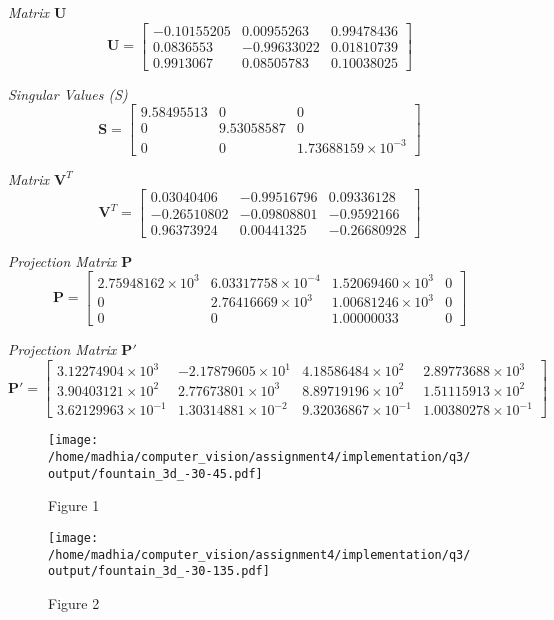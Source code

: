 \documentclass{article}
\begin{document}
\textit{Matrix $\mathbf{U}$}
\[
\mathbf{U} = \begin{bmatrix}
-0.10155205 & 0.00955263 & 0.99478436 \\ 
0.0836553 & -0.99633022 & 0.01810739 \\ 
0.9913067 & 0.08505783 & 0.10038025 
\end{bmatrix}
\]

\textit{Singular Values (S)}
\[
\mathbf{S} = \begin{bmatrix}
9.58495513 & 0 & 0 \\ 
0 & 9.53058587 & 0 \\ 
0 & 0 & 1.73688159 \times 10^{-3} 
\end{bmatrix}
\]

\textit{Matrix $\mathbf{V}^T$}
\[
\mathbf{V}^T = \begin{bmatrix}
0.03040406 & -0.99516796 & 0.09336128 \\ 
-0.26510802 & -0.09808801 & -0.9592166 \\ 
0.96373924 & 0.00441325 & -0.26680928 
\end{bmatrix}
\]

\textit{Projection Matrix $\mathbf{P}$}
\[
\mathbf{P} = \begin{bmatrix}
2.75948162 \times 10^{3} & 6.03317758 \times 10^{-4} & 1.52069460 \times 10^{3} & 0 \\ 
0 & 2.76416669 \times 10^{3} & 1.00681246 \times 10^{3} & 0 \\ 
0 & 0 & 1.00000033 & 0 
\end{bmatrix}
\]

\textit{Projection Matrix $\mathbf{P}'$}
\[
\mathbf{P}' = \begin{bmatrix}
3.12274904 \times 10^{3} & -2.17879605 \times 10^{1} & 4.18586484 \times 10^{2} & 2.89773688 \times 10^{3} \\ 
3.90403121 \times 10^{2} & 2.77673801 \times 10^{3} & 8.89719196 \times 10^{2} & 1.51115913 \times 10^{2} \\ 
3.62129963 \times 10^{-1} & 1.30314881 \times 10^{-2} & 9.32036867 \times 10^{-1} & 1.00380278 \times 10^{-1} 
\end{bmatrix}
\]

\begin{figure}[h!]
    \centering
    \begin{minipage}{0.4\textwidth}
        \centering
        \texttt{[image: /home/madhia/computer\_vision/assignment4/implementation/q3/output/fountain\_3d\_-30-45.pdf]}
        \caption{Figure 1}
    \end{minipage}%
    \begin{minipage}{0.4\textwidth}
        \centering
        \texttt{[image: /home/madhia/computer\_vision/assignment4/implementation/q3/output/fountain\_3d\_-30-135.pdf]}
        \caption{Figure 2}
    \end{minipage}%
\end{figure}
\end{document}
